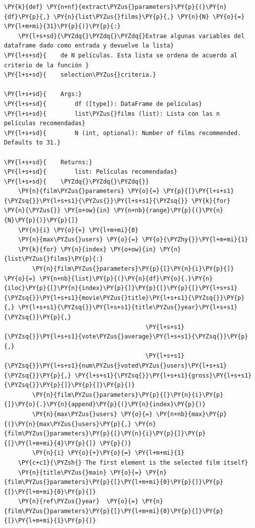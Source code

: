     \begin{tcolorbox}[breakable, size=fbox, boxrule=1pt, pad at break*=1mm,colback=cellbackground, colframe=cellborder]
\begin{Verbatim}[commandchars=\\\{\}]
\PY{k}{def} \PY{n+nf}{extract\PYZus{}parameters}\PY{p}{(}\PY{n}{df}\PY{p}{,} \PY{n}{list\PYZus{}films}\PY{p}{,} \PY{n}{N} \PY{o}{=} \PY{l+m+mi}{31}\PY{p}{)}\PY{p}{:}
    \PY{l+s+sd}{\PYZdq{}\PYZdq{}\PYZdq{}Extrae algunas variables del dataframe dado como entrada y devuelve la lista}
\PY{l+s+sd}{    de N películas. Esta lista se ordena de acuerdo al criterio de la función }
\PY{l+s+sd}{    selection\PYZus{}criteria.}

\PY{l+s+sd}{    Args:}
\PY{l+s+sd}{        df ([type]): DataFrame de películas}
\PY{l+s+sd}{        list\PYZus{}films (list): Lista con las n películas recomendadas}
\PY{l+s+sd}{        N (int, optional): Number of films recommended. Defaults to 31.}

\PY{l+s+sd}{    Returns:}
\PY{l+s+sd}{        list: Películas recomendadas}
\PY{l+s+sd}{    \PYZdq{}\PYZdq{}\PYZdq{}}
    \PY{n}{film\PYZus{}parameters} \PY{o}{=} \PY{p}{[}\PY{l+s+s1}{\PYZsq{}}\PY{l+s+s1}{\PYZus{}}\PY{l+s+s1}{\PYZsq{}} \PY{k}{for} \PY{n}{\PYZus{}} \PY{o+ow}{in} \PY{n+nb}{range}\PY{p}{(}\PY{n}{N}\PY{p}{)}\PY{p}{]}
    \PY{n}{i} \PY{o}{=} \PY{l+m+mi}{0}
    \PY{n}{max\PYZus{}users} \PY{o}{=} \PY{o}{\PYZhy{}}\PY{l+m+mi}{1}
    \PY{k}{for} \PY{n}{index} \PY{o+ow}{in} \PY{n}{list\PYZus{}films}\PY{p}{:}
        \PY{n}{film\PYZus{}parameters}\PY{p}{[}\PY{n}{i}\PY{p}{]} \PY{o}{=} \PY{n+nb}{list}\PY{p}{(}\PY{n}{df}\PY{o}{.}\PY{n}{iloc}\PY{p}{[}\PY{n}{index}\PY{p}{]}\PY{p}{[}\PY{p}{[}\PY{l+s+s1}{\PYZsq{}}\PY{l+s+s1}{movie\PYZus{}title}\PY{l+s+s1}{\PYZsq{}}\PY{p}{,} \PY{l+s+s1}{\PYZsq{}}\PY{l+s+s1}{title\PYZus{}year}\PY{l+s+s1}{\PYZsq{}}\PY{p}{,}
                                        \PY{l+s+s1}{\PYZsq{}}\PY{l+s+s1}{vote\PYZus{}average}\PY{l+s+s1}{\PYZsq{}}\PY{p}{,} 
                                        \PY{l+s+s1}{\PYZsq{}}\PY{l+s+s1}{num\PYZus{}voted\PYZus{}users}\PY{l+s+s1}{\PYZsq{}}\PY{p}{,} \PY{l+s+s1}{\PYZsq{}}\PY{l+s+s1}{gross}\PY{l+s+s1}{\PYZsq{}}\PY{p}{]}\PY{p}{]}\PY{p}{)}
        \PY{n}{film\PYZus{}parameters}\PY{p}{[}\PY{n}{i}\PY{p}{]}\PY{o}{.}\PY{n}{append}\PY{p}{(}\PY{n}{index}\PY{p}{)}
        \PY{n}{max\PYZus{}users} \PY{o}{=} \PY{n+nb}{max}\PY{p}{(}\PY{n}{max\PYZus{}users}\PY{p}{,} \PY{n}{film\PYZus{}parameters}\PY{p}{[}\PY{n}{i}\PY{p}{]}\PY{p}{[}\PY{l+m+mi}{4}\PY{p}{]} \PY{p}{)}
        \PY{n}{i} \PY{o}{+}\PY{o}{=} \PY{l+m+mi}{1}
    \PY{c+c1}{\PYZsh{} The first element is the selected film itself}
    \PY{n}{title\PYZus{}main} \PY{o}{=} \PY{n}{film\PYZus{}parameters}\PY{p}{[}\PY{l+m+mi}{0}\PY{p}{]}\PY{p}{[}\PY{l+m+mi}{0}\PY{p}{]}
    \PY{n}{ref\PYZus{}year}  \PY{o}{=} \PY{n}{film\PYZus{}parameters}\PY{p}{[}\PY{l+m+mi}{0}\PY{p}{]}\PY{p}{[}\PY{l+m+mi}{1}\PY{p}{]}


\end{Verbatim}
\end{tcolorbox}
